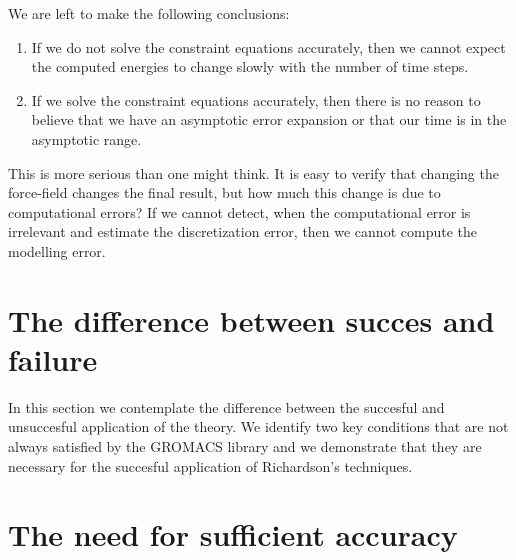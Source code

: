 \documentclass[runningheads]{llncs}
\begin{document}
We are left to make the following conclusions:
\begin{enumerate}
  \item If we do not solve the constraint equations accurately, then we cannot expect the computed energies to change slowly with the number of time steps.
  \item If we solve the constraint equations accurately, then there is no reason to believe that we have an asymptotic error expansion or that our time is in the asymptotic range.
  \end{enumerate}
  This is more serious than one might think. It is easy to verify that changing the force-field changes the final result, but how much this change is due to computational errors? If we cannot detect, when the computational error is irrelevant and estimate the discretization error, then we cannot compute the modelling error.






\section{The difference between succes and failure}

In this section we contemplate the difference between the succesful and unsuccesful application of the theory. We identify two key conditions that are not always satisfied by the GROMACS library and we demonstrate that they are necessary for the succesful application of Richardson's techniques.

\section{The need for sufficient accuracy}
\end{document}
